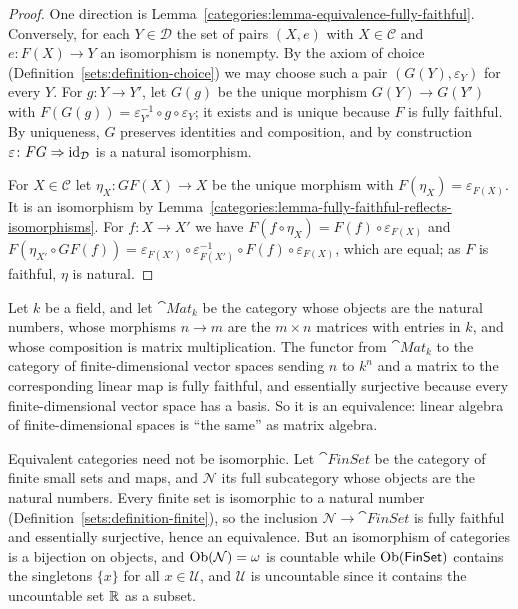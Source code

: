 \begin{proof}
One direction is Lemma~\ref{categories:lemma-equivalence-fully-faithful}.
Conversely, for each $Y \in \mathcal{D}$ the set of pairs $(X, e)$ with
$X \in \mathcal{C}$ and $e \colon F(X) \to Y$ an isomorphism is nonempty. By the axiom
of choice (Definition~\ref{sets:definition-choice}) we may choose such a pair
$(G(Y), \varepsilon_Y)$ for every $Y$. For $g \colon Y \to Y'$, let $G(g)$ be the
unique morphism $G(Y) \to G(Y')$ with
$F(G(g)) = \varepsilon_{Y'}^{-1} \circ g \circ \varepsilon_Y$; it exists and is unique
because $F$ is fully faithful. By uniqueness, $G$ preserves identities and
composition, and by construction $\varepsilon \colon FG \Rightarrow \mathrm{id}_{\mathcal{D}}$ is
a natural isomorphism.

For $X \in \mathcal{C}$ let $\eta_X \colon GF(X) \to X$ be the unique morphism with
$F(\eta_X) = \varepsilon_{F(X)}$. It is an isomorphism by
Lemma~\ref{categories:lemma-fully-faithful-reflects-isomorphisms}. For
$f \colon X \to X'$ we have $F(f \circ \eta_X) = F(f) \circ \varepsilon_{F(X)}$ and
$F(\eta_{X'} \circ GF(f)) = \varepsilon_{F(X')} \circ \varepsilon_{F(X')}^{-1} \circ F(f) \circ \varepsilon_{F(X)}$,
which are equal; as $F$ is faithful, $\eta$ is natural.
\end{proof}

\begin{example}\label{categories:example-matrices}
Let $k$ be a field, and let $\cat{Mat}_k$ be the category whose objects are the
natural numbers, whose morphisms $n \to m$ are the $m \times n$ matrices with
entries in $k$, and whose composition is matrix multiplication. The functor
from $\cat{Mat}_k$ to the category of finite-dimensional vector spaces sending
$n$ to $k^n$ and a matrix to the corresponding linear map is fully faithful,
and essentially surjective because every finite-dimensional vector space has
a basis. So it is an equivalence: linear algebra of finite-dimensional spaces
is ``the same'' as matrix algebra.
\end{example}

\begin{counterexample}\label{categories:counterexample-equivalence-not-isomorphism}
Equivalent categories need not be isomorphic. Let $\cat{FinSet}$ be the category of
finite small sets and maps, and $\mathcal{N}$ its full subcategory whose objects are
the natural numbers. Every finite set is isomorphic to a natural number
(Definition~\ref{sets:definition-finite}), so the inclusion
$\mathcal{N} \to \cat{FinSet}$ is fully faithful and essentially surjective, hence an
equivalence. But an isomorphism of categories is a bijection on objects, and
$\operatorname{Ob}(\mathcal{N}) = \omega$ is countable while $\operatorname{Ob}(\mathsf{FinSet})$ contains the
singletons $\{x\}$ for all $x \in \mathcal{U}$, and $\mathcal{U}$ is uncountable
since it contains the uncountable set $\mathbb{R}$ as a subset.
\end{counterexample}

